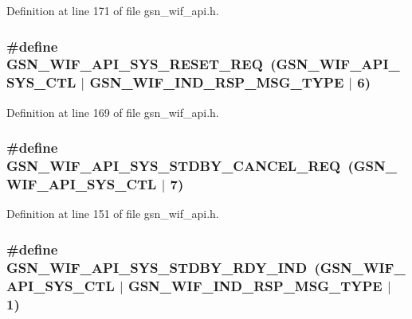 Definition at line 171 of file gsn\_\-wif\_\-api.h.

\hypertarget{a00606_a23247938aa161b346fd923ce298740fa}{
\subsubsection[{GSN\_\-WIF\_\-API\_\-SYS\_\-RESET\_\-REQ}]{\setlength{\rightskip}{0pt plus 5cm}\#define GSN\_\-WIF\_\-API\_\-SYS\_\-RESET\_\-REQ~(GSN\_\-WIF\_\-API\_\-SYS\_\-CTL $|$ GSN\_\-WIF\_\-IND\_\-RSP\_\-MSG\_\-TYPE $|$ 6)}}
\label{a00606_a23247938aa161b346fd923ce298740fa}


Definition at line 169 of file gsn\_\-wif\_\-api.h.

\hypertarget{a00606_ac2fcf63e15733f2b941ed0042282fa07}{
\subsubsection[{GSN\_\-WIF\_\-API\_\-SYS\_\-STDBY\_\-CANCEL\_\-REQ}]{\setlength{\rightskip}{0pt plus 5cm}\#define GSN\_\-WIF\_\-API\_\-SYS\_\-STDBY\_\-CANCEL\_\-REQ~(GSN\_\-WIF\_\-API\_\-SYS\_\-CTL $|$ 7)}}
\label{a00606_ac2fcf63e15733f2b941ed0042282fa07}


Definition at line 151 of file gsn\_\-wif\_\-api.h.

\hypertarget{a00606_a345e36cd22f979d5658b2810ea85bdae}{
\subsubsection[{GSN\_\-WIF\_\-API\_\-SYS\_\-STDBY\_\-RDY\_\-IND}]{\setlength{\rightskip}{0pt plus 5cm}\#define GSN\_\-WIF\_\-API\_\-SYS\_\-STDBY\_\-RDY\_\-IND~(GSN\_\-WIF\_\-API\_\-SYS\_\-CTL $|$ GSN\_\-WIF\_\-IND\_\-RSP\_\-MSG\_\-TYPE $|$ 1)}}
\label{a00606_a345e36cd22f979d5658b2810ea85bdae}


